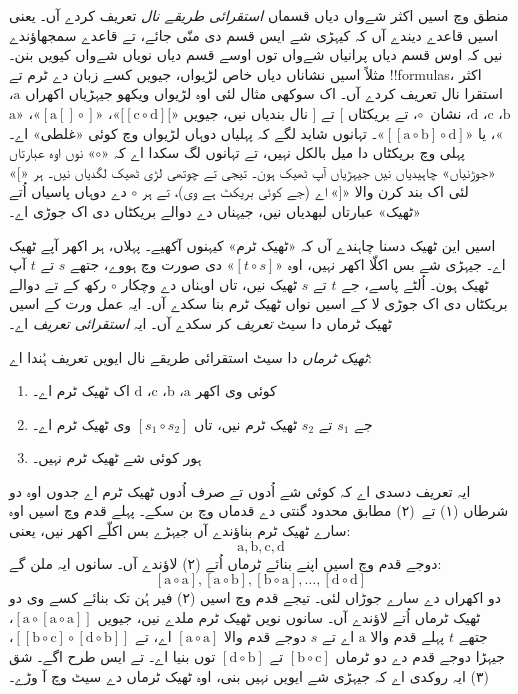 \documentclass[../../../include/open-logic-section]{subfiles}
\begin{document}


منطق وچ اسیں اکثر شےواں دیاں قسماں \emph{استقرائی طریقے نال} تعریف کردے آں۔ یعنی اسیں قاعدے دیندے آں کہ کیہڑی شے ایس قسم دی منّی جائے، تے قاعدے سمجھاؤندے نیں کہ اوس قسم دیاں پرانیاں شےواں توں اوسے قسم دیاں نویاں شےواں کیویں بنن۔ مثلاً اسیں نشاناں دیاں خاص لڑیواں، جیویں کسے زبان دے ٹرم تے !!{formula}s، اکثر استقرا نال تعریف کردے آں۔ اک سوکھی مثال لئی اوہ لڑیواں ویکھو جیہڑیاں اکھراں $\mathrm{a}$، $\mathrm{b}$، $\mathrm{c}$، $\mathrm{d}$، نشان~$\circ$، تے بریکٹاں $[$ تے $]$ نال بندیاں نیں، جیویں «$[[\mathrm{c} \circ \mathrm{d}][$»، «$[\mathrm{a}[]\circ]$»، «$\mathrm{a}$»، یا «$[[\mathrm{a} \circ \mathrm{b}]\circ
\mathrm{d}]$»۔ تہانوں شاید لگے کہ پہلیاں دوہاں لڑیواں وچ کوئی «غلطی» اے۔ پہلی وچ بریکٹاں دا میل بالکل نہیں، تے تہانوں لگ سکدا اے کہ «$\circ$» نوں اوہ عبارتاں «جوڑنیاں» چاہیدیاں نیں جیہڑیاں آپ ٹھیک ہون۔ تیجی تے چوتھی لڑی ٹھیک لگدیاں نیں۔ ہر «$[$» لئی اک بند کرن والا «$]$» اے (جے کوئی بریکٹ ہے وی)، تے ہر $\circ$ دے دوہاں پاسیاں اُتے «ٹھیک» عبارتاں لبھدیاں نیں، جیہناں دے دوالے بریکٹاں دی اک جوڑی اے۔

اسیں این ٹھیک دسنا چاہندے آں کہ «ٹھیک ٹرم» کیہنوں آکھیے۔ پہلاں، ہر اکھر آپے ٹھیک اے۔ جیہڑی شے بس اکلّا اکھر نہیں، اوہ «$[t \circ s]$» دی صورت وچ ہووے، جتھے $s$ تے $t$ آپ ٹھیک ہون۔ اُلٹے پاسے، جے $t$ تے $s$ ٹھیک نیں، تاں اوہناں دے وچکار $\circ$ رکھ کے تے دوالے بریکٹاں دی اک جوڑی لا کے اسیں نواں ٹھیک ٹرم بنا سکدے آں۔ ایہ عمل ورت کے اسیں ٹھیک ٹرماں دا سیٹ \emph{تعریف} کر سکدے آں۔ ایہ \emph{استقرائی تعریف} اے۔

\begin{defn}
  \emph{ٹھیک ٹرماں} دا سیٹ استقرائی طریقے نال ایویں تعریف ہُندا اے:
  \begin{enumerate}
  \item کوئی وی اکھر $\mathrm{a}$، $\mathrm{b}$، $\mathrm{c}$، $\mathrm{d}$ اک ٹھیک ٹرم اے۔
  \item جے $s_1$ تے $s_2$ ٹھیک ٹرم نیں، تاں $[s_1 \circ s_2]$ وی ٹھیک ٹرم اے۔
  \item ہور کوئی شے ٹھیک ٹرم نہیں۔
  \end{enumerate}
\end{defn}

ایہ تعریف دسدی اے کہ کوئی شے اُدوں تے صرف اُدوں ٹھیک ٹرم اے جدوں اوہ دو شرطاں (۱) تے~(۲) مطابق محدود گنتی دے قدماں وچ بن سکے۔ پہلے قدم وچ اسیں اوہ سارے ٹھیک ٹرم بناؤندے آں جیہڑے بس اکلّے اکھر نیں، یعنی:
\[
\mathrm{a}, \mathrm{b}, \mathrm{c}, \mathrm{d}
\]
دوجے قدم وچ اسیں اپنے بنائے ٹرماں اُتے (۲) لاؤندے آں۔ سانوں ایہ ملن گے:
\[
[\mathrm{a} \circ \mathrm{a}], [\mathrm{a} \circ \mathrm{b}],
[\mathrm{b} \circ \mathrm{a}], \dots, [\mathrm{d} \circ \mathrm{d}]
\]
دو اکھراں دے سارے جوڑاں لئی۔ تیجے قدم وچ اسیں (۲) فیر ہُن تک بنائے کسے وی دو ٹھیک ٹرماں اُتے لاؤندے آں۔ سانوں نویں ٹھیک ٹرم ملدے نیں، جیویں $[\mathrm{a} \circ [\mathrm{a} \circ
    \mathrm{a}]]$، جتھے $t$ پہلے قدم والا $\mathrm{a}$ اے تے $s$ دوجے قدم والا $[\mathrm{a} \circ \mathrm{a}]$ اے، تے $[[\mathrm{b} \circ
    \mathrm{c}] \circ [\mathrm{d} \circ \mathrm{b}]]$، جیہڑا دوجے قدم دے دو ٹرماں $[\mathrm{b} \circ \mathrm{c}]$ تے $[\mathrm{d}
  \circ \mathrm{b}]$ توں بنیا اے۔ تے ایس طرح اگے۔ شق (۳) ایہ روکدی اے کہ جیہڑی شے ایویں نہیں بنی، اوہ ٹھیک ٹرماں دے سیٹ وچ آ وڑے۔
\end{document}
